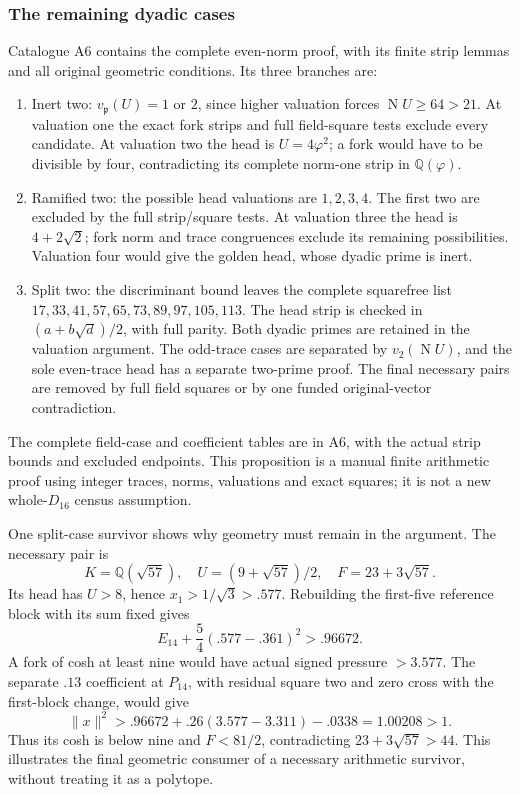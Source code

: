 \documentclass[11pt]{article}
\theoremstyle{remark}\newtheorem{remark}[theorem]{Remark}
\numberwithin{equation}{section}
\newcommand{\Q}{\mathbb Q}
\newcommand{\norm}[1]{\lVert #1\rVert}
\newcommand{\N}{\operatorname{N}}
\begin{document}
\subsubsection{The remaining dyadic cases}
Catalogue A6 contains the complete even-norm proof, with its finite strip
lemmas and all original geometric conditions. Its three branches are:
\begin{enumerate}[label=(\roman*)]
\item Inert two: $v_{\mathfrak p}(U)=1$ or $2$, since higher valuation
forces $\N U\ge64>21$. At valuation one the exact fork strips and
full field-square tests exclude every candidate. At valuation two the
head is $U=4\varphi^2$; a fork would have to be divisible by four,
contradicting its complete norm-one strip in $\Q(\varphi)$.
\item Ramified two: the possible head valuations are $1,2,3,4$.
The first two are excluded by the full strip/square tests. At valuation
three the head is $4+2\sqrt2$; fork norm and trace congruences exclude
its remaining possibilities. Valuation four would give the golden head,
whose dyadic prime is inert.
\item Split two: the discriminant bound leaves the complete squarefree
list $17,\allowbreak 33,\allowbreak 41,\allowbreak 57,\allowbreak 65,\allowbreak 73,\allowbreak 89,\allowbreak 97,\allowbreak 105,\allowbreak 113$. The head strip is checked in
$(a+b\sqrt d)/2$, with full parity. Both dyadic primes are retained
in the valuation argument. The odd-trace cases are separated by
$v_2(\N U)$, and the sole even-trace head has a separate two-prime
proof. The final necessary pairs are removed by full field squares or
by one funded original-vector contradiction.
\end{enumerate}
The complete field-case and coefficient tables are in A6, with the
actual strip bounds and excluded endpoints. This proposition is a
manual finite arithmetic proof using integer traces, norms, valuations
and exact squares; it is not a new whole-$D_{16}$ census assumption.

One split-case survivor shows why geometry must remain in the argument.
The necessary pair is
\[
 K=\Q(\sqrt{57}),\quad U=(9+\sqrt{57})/2,
 \quad F=23+3\sqrt{57}.
\]
Its head has $U>8$, hence $x_1>1/\sqrt3>.577$. Rebuilding the
first-five reference block with its sum fixed gives
\[
 E_{14}+\frac54(.577-.361)^2>.96672.
\]
A fork of cosh at least nine would have actual signed pressure $>3.577$.
The separate $.13$ coefficient at $P_{14}$, with residual square two
and zero cross with the first-block change, would give
\[
 \norm{x}^2>.96672+.26(3.577-3.311)-.0338=1.00208>1.
\]
Thus its cosh is below nine and $F<81/2$, contradicting
$23+3\sqrt{57}>44$. This illustrates the final geometric consumer
of a necessary arithmetic survivor, without treating it as a polytope.
\end{document}
